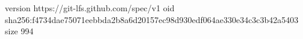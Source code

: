 version https://git-lfs.github.com/spec/v1
oid sha256:f4734dae75071eebbda2b8a6d20157ec98d930edf064ae330e34c3c3b42a5403
size 994
